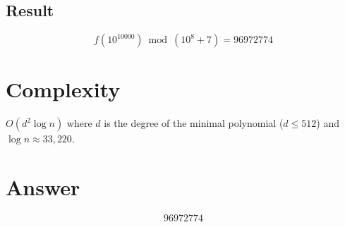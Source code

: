\documentclass[12pt]{article}
\begin{document}
\subsection{Result}
\[
f(10^{10000}) \bmod (10^8 + 7) = \boxed{96972774}
\]

\section{Complexity}
$O(d^2 \log n)$ where $d$ is the degree of the minimal polynomial ($d \le 512$) and $\log n \approx 33{,}220$.

\section{Answer}

\[
\boxed{96972774}
\]
\end{document}
